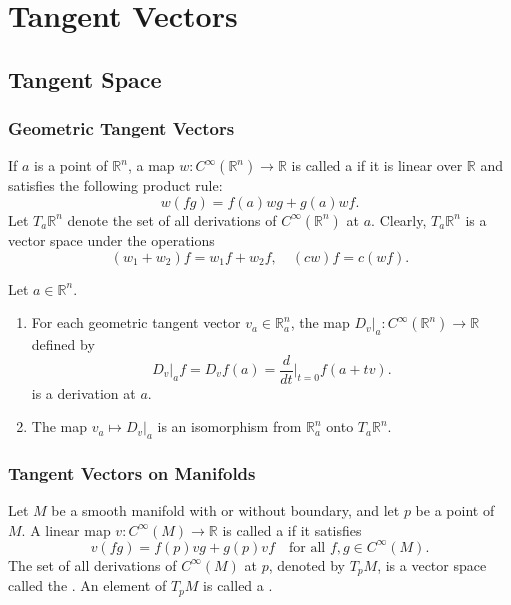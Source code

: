 \documentclass[../main.tex]{subfiles}
\begin{document}
\ifSubfilesClassLoaded{

    
}{}

\chapter{ Tangent Vectors }

\section{Tangent Space}

\subsection{Geometric Tangent Vectors}

\begin{definition}{}{}
     If $a$ is a point of $\mathbb{R}^n$, a map $w: C^\infty(\mathbb{R}^n) \to \mathbb{R}$ is called a  if it is linear over $\mathbb{R}$ and satisfies the following product rule:
$$w(fg) = f(a)wg + g(a)wf.$$
Let $T_a\mathbb{R}^n$ denote the set of all derivations of $C^\infty(\mathbb{R}^n)$ at $a$. Clearly, $T_a\mathbb{R}^n$ is a vector space under the operations
$$(w_1 + w_2)f = w_1f + w_2f, \quad (cw)f = c(wf).$$
\end{definition}

\begin{proposition}{}{}
Let $a \in \mathbb{R}^n$.
\begin{enumerate}
\item[(a)] For each geometric tangent vector $v_a \in \mathbb{R}_a^n$, the map $D_v|_a : C^\infty(\mathbb{R}^n) \to \mathbb{R}$ defined by\[
D_v|_a f = D_v f(a) = \frac{d}{dt}\Big|_{t=0} f(a+tv).
\]
  is a derivation at $a$.
\item[(b)] The map $v_a \mapsto D_v|_a$ is an isomorphism from $\mathbb{R}_a^n$ onto $T_a\mathbb{R}^n$.
\end{enumerate}
\end{proposition}

\subsection{Tangent Vectors on Manifolds}

\begin{definition}{}{}
    Let $M$ be a smooth manifold with or without boundary, and let $p$ be a point of $M$. A linear map $v: C^\infty(M) \to \mathbb{R}$ is called a  if it satisfies
\begin{equation}
    v(fg) = f(p)vg + g(p)vf \quad \text{for all } f,g \in C^\infty(M).
\end{equation}
The set of all derivations of $C^\infty(M)$ at $p$, denoted by $T_p M$, is a vector space called the . An element of $T_p M$ is called a .
\end{definition}
\end{document}

